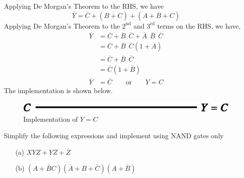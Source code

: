 \begin{solution}
\begin{itemize}
\eject
\noindent
Applying De Morgan's Theorem to the RHS, we have
$$
\overline{Y}=\overline{C}+(\overline{B+C})+(\overline{A+B+C})
$$
Applying De Morgan's Theorem to the $2^{\text{nd}}$ and $3^{\text{rd}}$ terms on the RHS, we have,
\begin{align*}
\overline{Y} &= \overline{C}+\overline{B}
\ \ \overline{C}+\overline{A} \ \ \overline{B} \ \ \overline{C}\\[4pt]
&= \overline{C}+\overline{B} \ \ \overline{C}(1+\overline{A})\\[4pt]
&= \overline{C}+\overline{B} \ \ \overline{C}\\[4pt]
&= \overline{C}(1+\overline{B})\\[4pt]
\overline{Y} &= \overline{C}\qquad \text{or}\qquad Y = C
\end{align*}
The implementation is shown below.
\begin{figure}[H]
\centering
\includegraphics{chap6/fig113a.eps}
\caption*{Implementation of $Y=C$}
\end{figure}
\end{itemize}
\vskip -1cm
\end{solution}

\smallskip
\begin{example}\label{exam6.31}
Simplify the following expressions and implement using NAND gates only
\begin{itemize}
\item[(a)] $XYZ+YZ+\overline{Z}$

\item[(b)] $(A+\overline{B}C)(\overline{A}+B+\overline{C})(A+\overline{B})$
\end{itemize}
\end{example}

